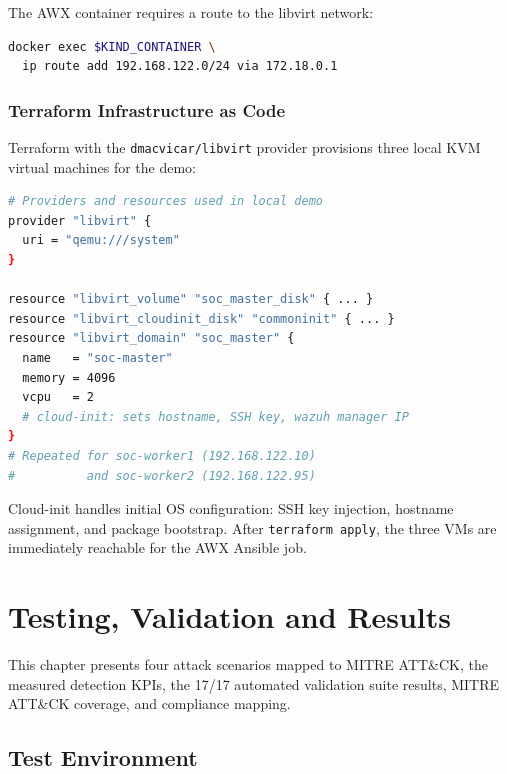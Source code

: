 \documentclass[12pt,a4paper]{report}
\begin{document}
The AWX container requires a route to the libvirt network:
\begin{lstlisting}[language=bash, caption=AWX kind container route to KVM VMs]
docker exec $KIND_CONTAINER \
  ip route add 192.168.122.0/24 via 172.18.0.1
\end{lstlisting}

\subsection{Terraform Infrastructure as Code}

Terraform with the \texttt{dmacvicar/libvirt} provider provisions three local KVM virtual machines for the demo:

\begin{lstlisting}[language=bash, caption=Key Terraform resource types used]
# Providers and resources used in local demo
provider "libvirt" {
  uri = "qemu:///system"
}

resource "libvirt_volume" "soc_master_disk" { ... }
resource "libvirt_cloudinit_disk" "commoninit" { ... }
resource "libvirt_domain" "soc_master" {
  name   = "soc-master"
  memory = 4096
  vcpu   = 2
  # cloud-init: sets hostname, SSH key, wazuh manager IP
}
# Repeated for soc-worker1 (192.168.122.10)
#          and soc-worker2 (192.168.122.95)
\end{lstlisting}

Cloud-init handles initial OS configuration: SSH key injection, hostname assignment, and package bootstrap. After \texttt{terraform apply}, the three VMs are immediately reachable for the AWX Ansible job.

\chapter{Testing, Validation and Results}
\minitoc
\vspace{1cm}

This chapter presents four attack scenarios mapped to MITRE ATT\&CK, the measured detection KPIs, the 17/17 automated validation suite results, MITRE ATT\&CK coverage, and compliance mapping.

\section{Test Environment}
\end{document}
